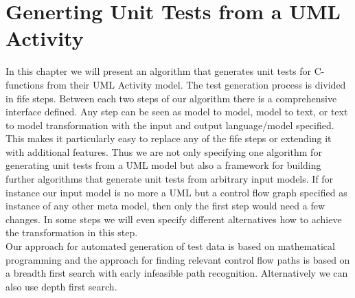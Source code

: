 \chapter{Generting Unit Tests from a UML Activity}
\label{chap:testgeneration}
In this chapter we will present an algorithm that generates unit tests for C-functions from their UML Activity model. The test generation process is divided in fife steps. Between each two steps of our algorithm there is a comprehensive interface defined. Any step can be seen as model to model, model to text, or text to model transformation with the input and output language/model specified. This makes it particularly easy to replace any of the fife steps or extending it with additional features. Thus we are not only specifying one algorithm for generating unit tests from a UML model but also a framework for building further algorithms that generate unit tests from arbitrary input models. If for instance our input model is no more a UML  but a control flow graph specified as instance of any other meta model, then only the first step would need a few changes. In some steps we will even specify different alternatives how to achieve the transformation in this step.\\

Our approach for automated generation of test data is based on mathematical programming and the approach for finding relevant control flow paths is based on a breadth first search with early infeasible path recognition. Alternatively we can also use depth first search.
